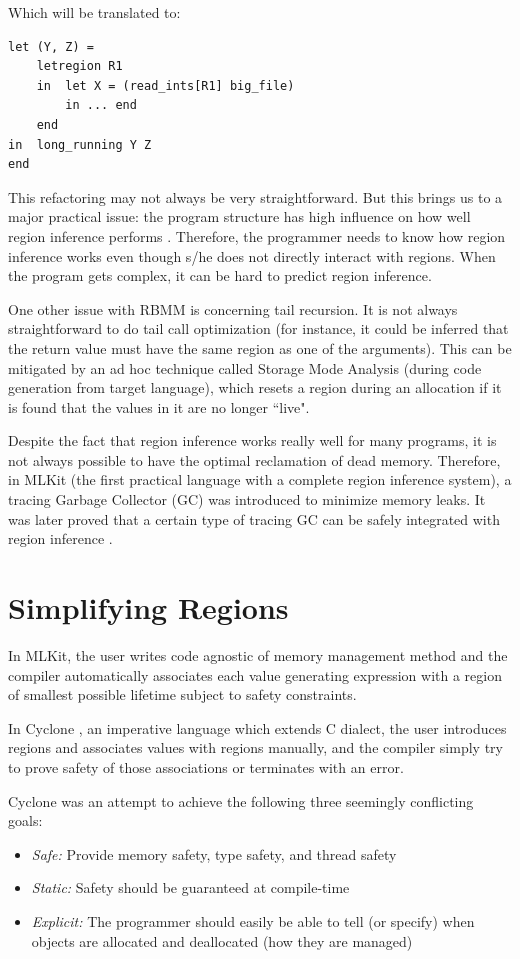 \documentclass[11pt]{report}
\begin{document}
\noindent Which will be translated to:

\begin{lstlisting}
let (Y, Z) =
    letregion R1
    in  let X = (read_ints[R1] big_file)
        in ... end
    end
in  long_running Y Z
end
\end{lstlisting}

This refactoring may not always be very straightforward. But this brings us to a major practical issue: the program structure has high influence on how well region inference performs \cite{regionretro}. Therefore, the programmer needs to know how region inference works even though s/he does not directly interact with regions. When the program gets complex, it can be hard to predict region inference.

One other issue with RBMM is concerning tail recursion. It is not always straightforward to do tail call optimization (for instance, it could be inferred that the return value must have the same region as one of the arguments). This can be mitigated by an ad hoc technique called Storage Mode Analysis (during code generation from target language), which resets a region during an allocation if it is found that the values in it are no longer ``live".

Despite the fact that region inference works really well for many programs, it is not always possible to have the optimal reclamation of dead memory. Therefore, in MLKit\cite{mlkitgh} (the first practical language with a complete region inference system), a tracing Garbage Collector (GC) was introduced \cite{elsmanthesis} to minimize memory leaks. It was later proved that a certain type of tracing GC can be safely integrated with region inference \cite{elsmangc}.

\chapter{Simplifying Regions}

In MLKit, the user writes code agnostic of memory management method and the compiler automatically associates each value generating expression with a region of smallest possible lifetime subject to safety constraints.

In Cyclone \cite{grossmanrbmm}, an imperative language which extends C dialect, the user introduces regions and associates values with regions manually, and the compiler simply try to prove safety of those associations or terminates with an error.

Cyclone was an attempt to achieve the following three seemingly conflicting goals:
\begin{itemize}
\item \textit{Safe:} Provide memory safety, type safety, and thread safety
\item \textit{Static:} Safety should be guaranteed at compile-time
\item \textit{Explicit:} The programmer should easily be able to tell (or specify) when objects are allocated and deallocated (how they are managed)
\end{itemize}
\end{document}
